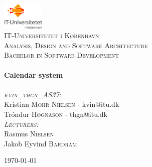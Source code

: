 \begin{titlepage}
\begin{center}

\includegraphics[width=0.15\textwidth]{./logo}~\\[1cm]

\textsc{\LARGE IT-Universitetet i København}\\[1.5cm]

\textsc{\Large Analysis, Design and Software Architecture}\\[0.5cm]
\textsc{Bachelor in Software Development}\\[0.5cm]

\HRule \\[0.4cm]
{ \huge \bfseries Calendar system \\[0.4cm] }
\HRule \\[1.5cm]

\textsc{\LARGE \emph{kvin\_thgn\_AS\.37:}}\\
\vspace{2 mm}
\large
Kristian \textsc{Mohr Nielsen} - kvin@itu.dk\\
Tróndur \textsc{Høgnason} - thgn@itu.dk\\
\vspace{10 mm}
\large
\textsc{\large \emph{Lecturers:}}\\
\vspace{1 mm}
Rasmus \textsc{Nielsen} \\
Jakob Eyvind \textsc{Bardram}

\vfill

{\large \today}
\end{center}
\end{titlepage}